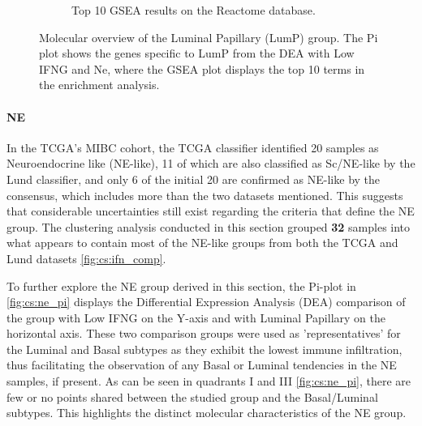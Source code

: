 \begin{figure}[H]
\begin{subfigure}[!t]{0.69\textwidth}
        \caption{Top 10 GSEA results on the Reactome database.}
        \label{fig:cs:lumP_gsea}
    \end{subfigure} 
    \centering
    \caption{Molecular overview of the Luminal Papillary (LumP) group. The Pi plot shows the genes specific to LumP from the DEA with Low IFNG and Ne, where the GSEA plot displays the top 10 terms in the enrichment analysis.} 
    \label{fig:cs:lump}
\end{figure}



\paragraph*{NE}


In the TCGA's MIBC cohort, the TCGA classifier identified 20 samples as Neuroendocrine like (NE-like), 11 of which are also classified as Sc/NE-like by the Lund classifier, and only 6 of the initial 20 are confirmed as NE-like by the consensus, which includes more than the two datasets mentioned. This suggests that considerable uncertainties still exist regarding the criteria that define the NE group. The clustering analysis conducted in this section grouped \textbf{32} samples into what appears to contain most of the NE-like groups from both the TCGA and Lund datasets \cref{fig:cs:ifn_comp}.

To further explore the NE group derived in this section, the Pi-plot in \cref{fig:cs:ne_pi} displays the Differential Expression Analysis (DEA) comparison of the group with Low IFNG on the Y-axis and with Luminal Papillary on the horizontal axis. These two comparison groups were used as 'representatives' for the Luminal and Basal subtypes as they exhibit the lowest immune infiltration, thus facilitating the observation of any Basal or Luminal tendencies in the NE samples, if present. As can be seen in quadrants I and III \cref{fig:cs:ne_pi}, there are few or no points shared between the studied group and the Basal/Luminal subtypes. This highlights the distinct molecular characteristics of the NE group.

